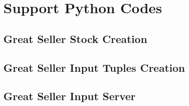 \chapter{Support Python Codes}
\label{sec:Appendix2}

\section{Great Seller Stock Creation}
\label{sec:Appendix2Sec1}



\section{Great Seller Input Tuples Creation}
\label{sec:Appendix2Sec2}



\section{Great Seller Input Server}
\label{sec:Appendix2Sec3}


